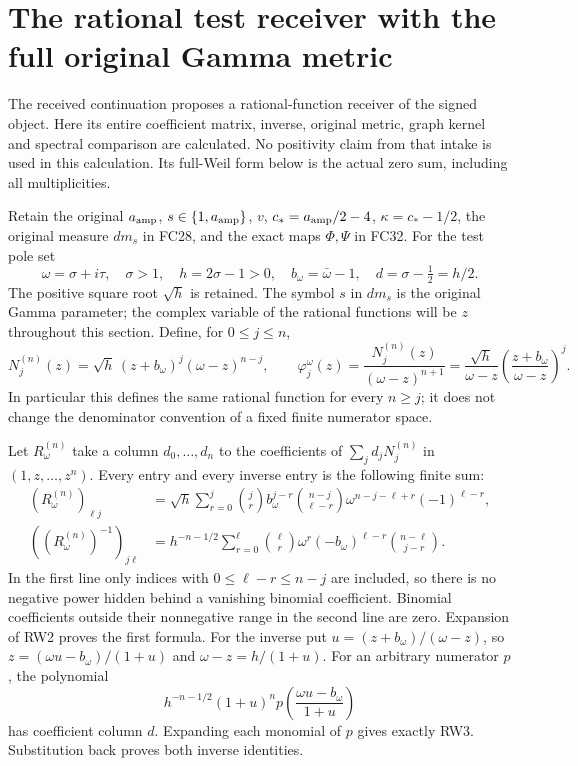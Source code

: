 \section{The rational test receiver with the full original Gamma metric}
The received continuation \cite[Equations (33)--(36)]{ResidueIntake}
proposes a rational-function receiver of the signed object. Here its
entire coefficient matrix, inverse, original metric, graph kernel and
spectral comparison are calculated. No positivity claim from that
intake is used in this calculation. Its full-Weil form below is the
actual zero sum, including all multiplicities.

Retain the original $a_{\rm amp}$, $s\in\{1,a_{\rm amp}\}$,
$v$, $c_*=a_{\rm amp}/2-4$, $\kappa=c_*-1/2$,
the original measure $dm_s$ in FC28, and the exact maps
$\Phi,\Psi$ in FC32. For the test pole set
\[
 \omega=\sigma+i\tau,\quad\sigma>1,\quad
 h=2\sigma-1>0,\quad b_\omega=\bar\omega-1,\quad
 d=\sigma-\tfrac12=h/2.
 \tag{RW1}
\]
The positive square root $\sqrt h$ is retained. The symbol $s$ in
$dm_s$ is the original Gamma parameter; the complex variable of
the rational functions will be $z$ throughout this section.
Define, for $0\le j\le n$,
\[
 N_j^{(n)}(z)=\sqrt h\,(z+b_\omega)^j(\omega-z)^{n-j},\qquad
 \varphi_j^\omega(z)=\frac{N_j^{(n)}(z)}{(\omega-z)^{n+1}}
 =\frac{\sqrt h}{\omega-z}
           \left(\frac{z+b_\omega}{\omega-z}\right)^j.
 \tag{RW2}
\]
In particular this defines the same rational function for every
$n\ge j$; it does not change the denominator convention of a
fixed finite numerator space.

Let $R_\omega^{(n)}$ take a column $d_0,\ldots,d_n$ to the
coefficients of $\sum_jd_jN_j^{(n)}$ in $(1,z,\ldots,z^n)$.
Every entry and every inverse entry is the following finite sum:
\[
 \begin{aligned}
 (R_\omega^{(n)})_{\ell j}
  &=\sqrt h\sum_{r=0}^j
    \binom jr b_\omega^{j-r}
    \binom{n-j}{\ell-r}\omega^{n-j-\ell+r}(-1)^{\ell-r},\\
 ((R_\omega^{(n)})^{-1})_{j\ell}
  &=h^{-n-1/2}\sum_{r=0}^{\ell}
     \binom\ell r\omega^r(-b_\omega)^{\ell-r}
                         \binom{n-\ell}{j-r}.
 \end{aligned}\tag{RW3}
\]
In the first line only indices with $0\le\ell-r\le n-j$
are included, so there is no negative power hidden behind a
vanishing binomial coefficient. Binomial coefficients outside
their nonnegative range in the second line are zero.
Expansion of RW2 proves the first formula. For the inverse put
$u=(z+b_\omega)/(\omega-z)$, so
$z=(\omega u-b_\omega)/(1+u)$ and
$\omega-z=h/(1+u)$. For an arbitrary numerator $p$, the polynomial
\[
 h^{-n-1/2}(1+u)^n
                   p\left(\frac{\omega u-b_\omega}{1+u}\right)
\]
has coefficient column $d$. Expanding each monomial of $p$
gives exactly RW3. Substitution back proves both inverse identities.

